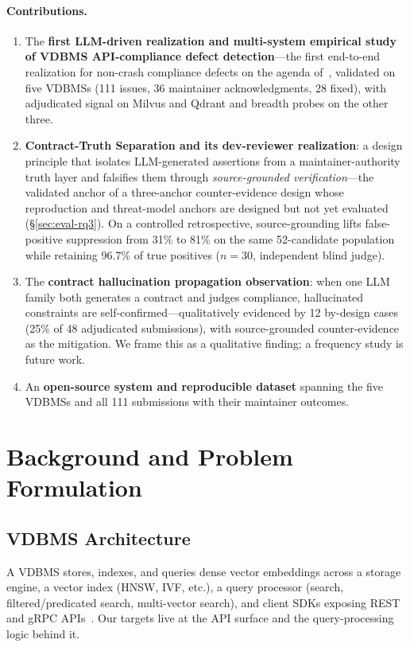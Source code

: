 \documentclass[sigconf]{acmart}
\begin{document}
\paragraph{Contributions.}
\begin{enumerate}[leftmargin=*,itemsep=2pt]
\item The \textbf{first LLM-driven realization and multi-system empirical study of VDBMS API-compliance defect detection}---the first end-to-end realization for non-crash compliance defects on the agenda of~\cite{roadmap25}, validated on five VDBMSs (111 issues, 36 maintainer acknowledgments, 28 fixed), with adjudicated signal on Milvus and Qdrant and breadth probes on the other three.
\item \textbf{Contract-Truth Separation and its dev-reviewer realization}: a design principle that isolates LLM-generated assertions from a maintainer-authority truth layer and falsifies them through \emph{source-grounded verification}---the validated anchor of a three-anchor counter-evidence design whose reproduction and threat-model anchors are designed but not yet evaluated (\S\ref{sec:eval-rq3}). On a controlled retrospective, source-grounding lifts false-positive suppression from 31\% to 81\% on the same 52-candidate population while retaining 96.7\% of true positives ($n{=}30$, independent blind judge).
\item The \textbf{contract hallucination propagation observation}: when one LLM family both generates a contract and judges compliance, hallucinated constraints are self-confirmed---qualitatively evidenced by 12 by-design cases (25\% of 48 adjudicated submissions), with source-grounded counter-evidence as the mitigation. We frame this as a qualitative finding; a frequency study is future work.
\item An \textbf{open-source system and reproducible dataset} spanning the five VDBMSs and all 111 submissions with their maintainer outcomes.
\end{enumerate}

\section{Background and Problem Formulation}\label{sec:bg}

\subsection{VDBMS Architecture}
A VDBMS stores, indexes, and queries dense vector embeddings across a storage engine, a vector index (HNSW, IVF, etc.), a query processor (search, filtered/predicated search, multi-vector search), and client SDKs exposing REST and gRPC APIs~\cite{roadmap25}. Our targets live at the API surface and the query-processing logic behind it.
\end{document}
